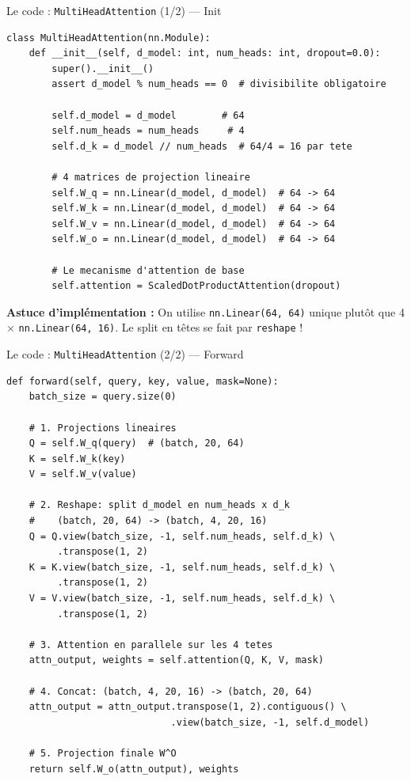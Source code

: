 \documentclass[aspectratio=169, 11pt]{beamer}
\begin{document}
\begin{frame}[fragile]{Le code : \texttt{MultiHeadAttention} (1/2) --- Init}
\begin{lstlisting}[style=python, title={\texttt{src/transformers/attention.py} --- Projections Q, K, V}]
class MultiHeadAttention(nn.Module):
    def __init__(self, d_model: int, num_heads: int, dropout=0.0):
        super().__init__()
        assert d_model % num_heads == 0  # divisibilite obligatoire

        self.d_model = d_model        # 64
        self.num_heads = num_heads     # 4
        self.d_k = d_model // num_heads  # 64/4 = 16 par tete

        # 4 matrices de projection lineaire
        self.W_q = nn.Linear(d_model, d_model)  # 64 -> 64
        self.W_k = nn.Linear(d_model, d_model)  # 64 -> 64
        self.W_v = nn.Linear(d_model, d_model)  # 64 -> 64
        self.W_o = nn.Linear(d_model, d_model)  # 64 -> 64

        # Le mecanisme d'attention de base
        self.attention = ScaledDotProductAttention(dropout)
\end{lstlisting}

\vspace{0.3em}
\textbf{Astuce d'implémentation :} On utilise \texttt{nn.Linear(64, 64)} unique plutôt que 4 $\times$ \texttt{nn.Linear(64, 16)}. Le split en têtes se fait par \texttt{reshape} !
\end{frame}

\begin{frame}[fragile]{Le code : \texttt{MultiHeadAttention} (2/2) --- Forward}
\begin{lstlisting}[style=python, title={\texttt{src/transformers/attention.py} --- Forward pass}]
def forward(self, query, key, value, mask=None):
    batch_size = query.size(0)

    # 1. Projections lineaires
    Q = self.W_q(query)  # (batch, 20, 64)
    K = self.W_k(key)
    V = self.W_v(value)

    # 2. Reshape: split d_model en num_heads x d_k
    #    (batch, 20, 64) -> (batch, 4, 20, 16)
    Q = Q.view(batch_size, -1, self.num_heads, self.d_k) \
         .transpose(1, 2)
    K = K.view(batch_size, -1, self.num_heads, self.d_k) \
         .transpose(1, 2)
    V = V.view(batch_size, -1, self.num_heads, self.d_k) \
         .transpose(1, 2)

    # 3. Attention en parallele sur les 4 tetes
    attn_output, weights = self.attention(Q, K, V, mask)

    # 4. Concat: (batch, 4, 20, 16) -> (batch, 20, 64)
    attn_output = attn_output.transpose(1, 2).contiguous() \
                             .view(batch_size, -1, self.d_model)

    # 5. Projection finale W^O
    return self.W_o(attn_output), weights
\end{lstlisting}
\end{frame}
\end{document}
